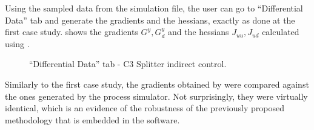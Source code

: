 \documentclass[../../msc-thesis.tex]{subfiles}
\begin{document}
Using the sampled data from the simulation file, the user can go to 
``Differential Data'' tab and generate the gradients and the hessians, exactly 
as done at the first case study.  shows the 
gradients $G^y, G^y_{d}$ and the hessians $J_{uu}, J_{ud}$ calculated using 
\mtc.

\begin{figure}[htb]
    \centering
    \caption{``Differential Data'' tab - C3 Splitter indirect control.}
    \label{fig:c3splittergrad}
\end{figure}

Similarly to the first case study, the gradients obtained by \mtc were 
compared against the ones generated by the process simulator. Not surprisingly, 
they were virtually identical, which is an evidence of the robustness of the 
previously proposed methodology \textcite{Alves2018} that is embedded in the 
\mtc software. 
\end{document}
